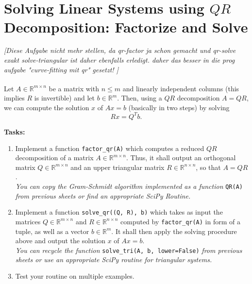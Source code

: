 \section{Solving Linear Systems using $QR$ Decomposition: Factorize and Solve}

\textit{\color{red}[Diese Aufgabe nicht mehr stellen, da qr-factor ja schon gemacht und qr-solve exakt solve-triangular ist daher ebenfalls erledigt. daher das besser in die prog aufgabe "curve-fitting mit qr" gesetzt!  ]}\\~\\
Let $A \in \mathbb{R}^{m\times n}$ be a matrix with $n \leq m$ and linearly independent columns (this implies $R$ is invertible) and let $b \in \mathbb{R}^m$. Then, using a $QR$ decomposition $A=QR$, we can compute the solution $x$ of $Ax=b$ (basically in two steps) by solving
$$Rx = Q^Tb.$$

\textbf{Tasks:}
\begin{enumerate}
	\item Implement a function \verb|factor_qr(A)| which computes a reduced $QR$ decomposition of a matrix $A \in \mathbb{R}^{m\times n}$. Thus, it shall output an orthogonal matrix $Q \in \mathbb{R}^{m\times n}$ and an upper triangular matrix $R \in\mathbb{R}^{n\times n}$, so that $A = QR$.\\ 
	\textit{You can copy the Gram-Schmidt algorithm implemented as a function} \verb|QR(A)| \textit{from previous sheets or find an appropriate SciPy Routine.}
	\item Implement a function \verb|solve_qr((Q, R), b)| which takes as input the matrices $Q \in \mathbb{R}^{m\times n}$ and $R \in\mathbb{R}^{n\times n}$ computed by \verb|factor_qr(A)| in form of a tuple, as well as a vector $b \in \mathbb{R}^{m}$. It shall then apply the solving procedure above and output the solution $x$ of $Ax=b$.\\ 
	\textit{You can recycle the function} \verb|solve_tri(A, b, lower=False)| \textit{from previous sheets or use an appropriate SciPy routine for triangular systems.}
	\item Test your routine on multiple examples.
\end{enumerate}

